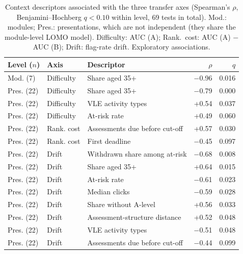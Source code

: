 \begin{table}[t]
\centering
\caption{Context descriptors associated with the three transfer axes (Spearman's $\rho$, Benjamini--Hochberg $q < 0.10$ within level, 69 tests in total). Mod.: modules; Pres.: presentations, which are not independent (they share the module-level LOMO model). Difficulty: AUC (A); Rank.\ cost: AUC (A) $-$ AUC (B); Drift: flag-rate drift. Exploratory associations.}
\label{tab:corr}
\footnotesize
\begin{tabular}{@{}llp{3.3cm}rr@{}}
\toprule
Level ($n$) & Axis & Descriptor & $\rho$ & $q$ \\
\midrule
Mod. (7) & Difficulty & Share aged 35+ & $-$0.96 & 0.016 \\
Pres. (22) & Difficulty & Share aged 35+ & $-$0.79 & 0.000 \\
Pres. (22) & Difficulty & VLE activity types & +0.54 & 0.037 \\
Pres. (22) & Difficulty & At-risk rate & +0.49 & 0.060 \\
Pres. (22) & Rank. cost & Assessments due before cut-off & +0.57 & 0.030 \\
Pres. (22) & Rank. cost & First deadline & $-$0.45 & 0.097 \\
Pres. (22) & Drift & Withdrawn share among at-risk & $-$0.68 & 0.008 \\
Pres. (22) & Drift & Share aged 35+ & +0.64 & 0.015 \\
Pres. (22) & Drift & At-risk rate & $-$0.61 & 0.023 \\
Pres. (22) & Drift & Median clicks & $-$0.59 & 0.028 \\
Pres. (22) & Drift & Share without A-level & +0.56 & 0.033 \\
Pres. (22) & Drift & Assessment-structure distance & +0.52 & 0.048 \\
Pres. (22) & Drift & VLE activity types & $-$0.51 & 0.048 \\
Pres. (22) & Drift & Assessments due before cut-off & $-$0.44 & 0.099 \\
\bottomrule
\end{tabular}
\end{table}
